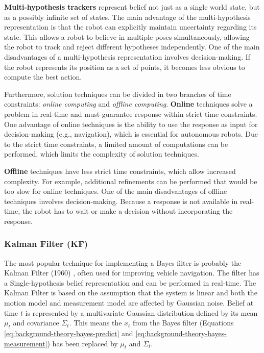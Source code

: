 \textbf{Multi-hypothesis trackers} represent belief not just as a single world state, but as a possibly infinite set of states.
The main advantage of the multi-hypothesis representation is that the robot can explicitly maintain uncertainty regarding its state.
This allows a robot to believe in multiple poses simultaneously, allowing the robot to track and reject different hypotheses independently.
One of the main disadvantages of a multi-hypothesis representation involves decision-making.
If the robot represents its position as a set of points, it becomes less obvious to compute the best action.

Furthermore, solution techniques can be divided in two branches of time constraints: \textit{online computing} and \textit{offline computing}.
\textbf{Online} techniques solve a problem in real-time and must guarantee response within strict time constraints.
One advantage of online techniques is the ability to use the response as input for decision-making (e.g., navigation), which is essential for autonomous robots.
Due to the strict time constraints, a limited amount of computations can be performed, which limits the complexity of solution techniques.

\textbf{Offline} techniques have less strict time constraints, which allow increased complexity.
For example, additional refinements %
can be performed that would be too slow for online techniques.
One of the main disadvantages of offline techniques involves decision-making.
Because a response is not available in real-time, the robot has to wait or make a decision without incorporating the response.


\subsubsection{Kalman Filter (KF)}
\label{sec:prob-rob-kf}
The most popular technique for implementing a Bayes filter is probably the Kalman Filter (1960) \cite{kalman1960new}, often used for improving vehicle navigation.
The filter has a Single-hypothesis belief representation and can be performed in real-time.
The Kalman Filter is based on the assumption that the system is linear and both the motion model and measurement model are affected by Gaussian noise.
Belief at time $t$ is represented by a multivariate Gaussian distribution defined by its mean $\mu_t$ and covariance $\Sigma_t$.
This means the $x_t$ from the Bayes filter (Equations \eqref{eq:background-theory-bayes-predict} and \eqref{eq:background-theory-bayes-measurement}) has been replaced by $\mu_t$ and $\Sigma_t$.

